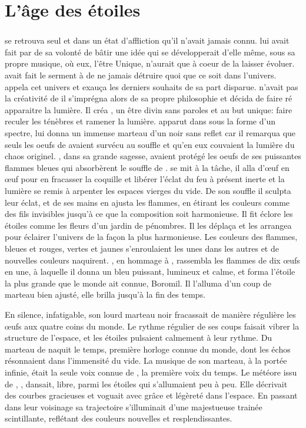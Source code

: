 \chapter{L'âge des étoiles}

\subsection{\Cind}

\Cind se retrouva seul et dans un état d'affliction qu'il n'avait jamais connu. \Mey lui avait fait par de sa volonté de bâtir une idée qui se développerait d'elle même, sous sa propre musique, où eux, l'être Unique, n'aurait que à coeur de la laisser évoluer. \Cind avait fait le serment à \Mey de ne jamais détruire quoi que ce soit dans l'univers. \Cind appela cet univers \Dreyma et exauça les derniers souhaits de sa part disparue. \Cind n'avait pas la créativité de \Mey il s'imprégna alors de sa propre philosophie et décida de faire ré apparaitre la lumière. Il créa \Carac, un être divin sans paroles et au but unique: faire reculer les ténèbres et ramener la lumière. \Carac apparut dans \Dreyma sous la forme d'un spectre, \Cind lui donna un immense marteau d'un noir sans reflet car il remarqua que seuls les oeufs de \Tot avaient survécu au souffle et qu'en eux couvaient la lumière du chaos originel. \Boromu, dans sa grande sagesse, avaient protégé les oeufs de ses puissantes flammes bleues qui absorbèrent le souffle de \Cind.  \Carac se mit à la tâche, il alla d'œuf en œuf pour en fracasser la coquille et libérer l'éclat du feu à présent inerte et la lumière se remis à arpenter les espaces vierges du vide. De son souffle il sculpta leur éclat, et de ses mains en ajusta les flammes, en étirant les couleurs comme des fils invisibles jusqu'à ce que la composition soit harmonieuse. Il fit éclore les étoiles comme les fleurs d'un jardin de pénombres. Il les déplaça et les arrangea pour éclairer l'univers de la façon la plus harmonieuse. Les couleurs des flammes, bleues et rouges, vertes et jaunes s'enroulaient les unes dans les autres et de nouvelles couleurs naquirent. \Carac, en hommage à \Boromu, rassembla les flammes de dix œufs en une, à laquelle il donna un bleu puissant, lumineux et calme, et forma l'étoile la plus grande que le monde ait connue, Boromil. Il l'alluma d'un coup de marteau bien ajusté, elle brilla jusqu'à la fin des temps. 

En silence, infatigable, son lourd marteau noir fracassait de manière régulière les œufs aux quatre coins du monde. Le rythme régulier de ses coups faisait vibrer la structure de l'espace, et les étoiles pulsaient calmement à leur rythme. Du marteau de \Carac naquit le temps, première horloge connue du monde, dont les échos résonnaient dans l'immensité du vide. La musique de son marteau, à la portée infinie, était la seule voix connue de \Carac, la première voix du temps. Le météore issu de \Mey, \Drisst, dansait, libre, parmi les étoiles qui s'allumaient peu à peu. Elle décrivait des courbes gracieuses et voguait avec grâce et légèreté dans l'espace. En passant dans leur voisinage sa trajectoire s'illuminait d'une majestueuse trainée scintillante, reflétant des couleurs nouvelles et resplendissantes.


